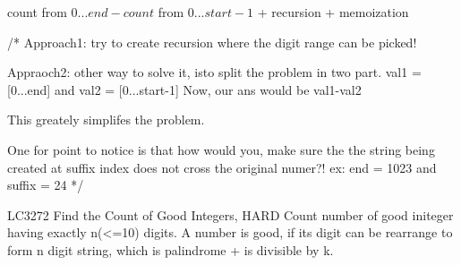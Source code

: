 \begin{solution}[hints]

    \begin{hints}
        count from $0...end - count$ from $0...start-1$
        + recursion 
        + memoization
    \end{hints}
    \begin{code2}
    /*
        Approach1: try to create recursion where the digit range can be picked!

        Appraoch2: other way to solve it, isto split the problem in two part.
            val1 = [0...end] and val2 = [0...start-1] Now, our ans would be val1-val2

            This greately simplifes the problem.

            One for point to notice is that how would you, make sure the the string being created at suffix index does not cross the original numer?!
                ex: end = 1023 and suffix = 24
    */
    \end{code2}
\end{solution}

\begin{problem}{LC3272 Find the Count of Good Integers, HARD}
    Count number of good initeger having exactly n(<=10) digits.
    A number is good, if its digit can be rearrange to form n digit string, which is palindrome + is divisible by k.

\end{problem}

